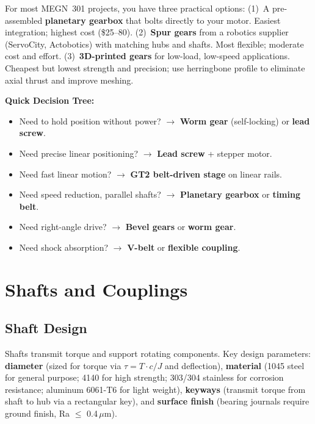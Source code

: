 \documentclass[11pt,letterpaper,twoside,openany]{book}
\begin{document}
\begin{tipbox}
For most MEGN~301 projects, you have three practical options: (1)~A pre-assembled \textbf{planetary gearbox} that bolts directly to your motor. Easiest integration; highest cost (\$25--80). (2)~\textbf{Spur gears} from a robotics supplier (ServoCity, Actobotics) with matching hubs and shafts. Most flexible; moderate cost and effort. (3)~\textbf{3D-printed gears} for low-load, low-speed applications. Cheapest but lowest strength and precision; use herringbone profile to eliminate axial thrust and improve meshing.

\textbf{Quick Decision Tree:}
\begin{itemize}[nosep]
\item Need to hold position without power? $\to$ \textbf{Worm gear} (self-locking) or \textbf{lead screw}.
\item Need precise linear positioning? $\to$ \textbf{Lead screw} + stepper motor.
\item Need fast linear motion? $\to$ \textbf{GT2 belt-driven stage} on linear rails.
\item Need speed reduction, parallel shafts? $\to$ \textbf{Planetary gearbox} or \textbf{timing belt}.
\item Need right-angle drive? $\to$ \textbf{Bevel gears} or \textbf{worm gear}.
\item Need shock absorption? $\to$ \textbf{V-belt} or \textbf{flexible coupling}.
\end{itemize}
\end{tipbox}

\FloatBarrier
\section{Shafts and Couplings}

\subsection{Shaft Design}
Shafts transmit torque and support rotating components. Key design parameters: \textbf{diameter} (sized for torque via $\tau = T \cdot c / J$ and deflection), \textbf{material} (1045 steel for general purpose; 4140 for high strength; 303/304 stainless for corrosion resistance; aluminum 6061-T6 for light weight), \textbf{keyways} (transmit torque from shaft to hub via a rectangular key), and \textbf{surface finish} (bearing journals require ground finish, Ra $\leq$ 0.4\,$\mu$m).
\end{document}
